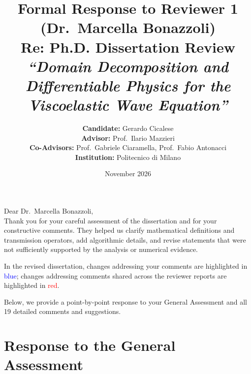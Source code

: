 \documentclass[11pt,a4paper]{article}
\begin{document}
\title{\textbf{\Large Formal Response to Reviewer 1 (Dr.~Marcella Bonazzoli)}\\[0.3em]
\large Re: Ph.D. Dissertation Review\\\emph{``Domain Decomposition and Differentiable Physics for the Viscoelastic Wave Equation''}}
\author{\textbf{Candidate:} Gerardo Cicalese\\[0.3em]
\textbf{Advisor:} Prof.~Ilario Mazzieri\\[0.3em]
\textbf{Co-Advisors:} Prof.~Gabriele Ciaramella, Prof.~Fabio Antonacci\\[0.3em]
\textbf{Institution:} Politecnico di Milano}
\date{November 2026}
\maketitle

\noindent Dear Dr.~Marcella Bonazzoli,\\[0.5em]
Thank you for your careful assessment of the dissertation and for your constructive comments. They helped us clarify mathematical definitions and transmission operators, add algorithmic details, and revise statements that were not sufficiently supported by the analysis or numerical evidence.

In the revised dissertation, changes addressing your comments are highlighted in \textcolor{blue}{blue}; changes addressing comments shared across the reviewer reports are highlighted in \textcolor{red}{red}.

Below, we provide a point-by-point response to your General Assessment and all 19 detailed comments and suggestions.

\tableofcontents
\newpage

\section{Response to the General Assessment}
\end{document}
